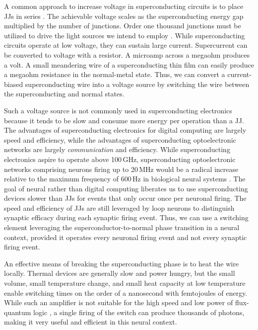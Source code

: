 \documentclass[twocolumn]{article}
\begin{document}
A common approach to increase voltage in superconducting circuits is to place JJs in series \cite{suin1988}. The achievable voltage scales as the superconducting energy gap multiplied by the number of junctions. Order one thousand junctions must be utilized to drive the light sources we intend to employ \cite{shbu2017,buch2017,bu2018}. While superconducting circuits operate at low voltage, they can sustain large current. Supercurrent can be converted to voltage with a resistor. A microamp across a megaohm produces a volt. A small meandering wire of a superconducting thin film can easily produce a megaohm resistance in the normal-metal state. Thus, we can convert a current-biased superconducting wire into a voltage source by switching the wire between the superconducting and normal states.

Such a voltage source is not commonly used in superconducting electronics because it tends to be slow and consume more energy per operation than a JJ. The advantages of superconducting electronics for digital computing are largely speed and efficiency, while the advantages of superconducting optoelectronic networks are largely \textit{communication} and efficiency. While superconducting electronics aspire to operate above 100\,GHz, superconducting optoelectronic networks comprising neurons firing up to 20\,MHz would be a radical increase relative to the maximum frequency of 600\,Hz in biological neural systems \cite{stsa2000,budr2004,bu2006}. The goal of neural rather than digital computing liberates us to use superconducting devices slower than JJs for events that only occur once per neuronal firing. The speed and efficiency of JJs are still leveraged by loop neurons to distinguish synaptic efficacy during each synaptic firing event. Thus, we can use a switching element leveraging the superconductor-to-normal phase transition in a neural context, provided it operates every neuronal firing event and not every synaptic firing event. 

An effective means of breaking the superconducting phase is to heat the wire locally. Thermal devices are generally slow and power hungry, but the small volume, small temperature change, and small heat capacity at low temperature \cite{lasa1988,du2015} enable switching times on the order of a nanosecond with femtojoules of energy. While such an amplifier is not suitable for the high speed and low power of flux-quantum logic \cite{hehe2011,mu2011,li2012,taoz2013}, a single firing of the switch can produce thousands of photons, making it very useful and efficient in this neural context.
\end{document}
